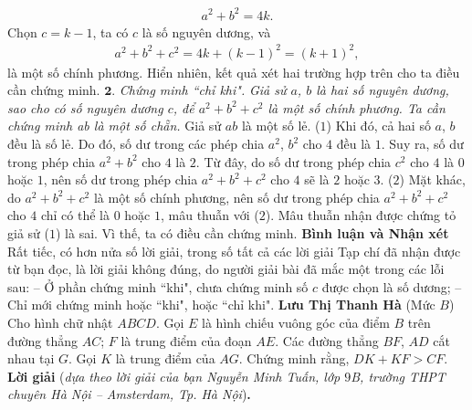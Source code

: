 \begin{multicols}{2}
\begin{align*}
		{a^2} + {b^2} = 4k.
	\end{align*}
	Chọn $c = k - 1$, ta có $c$ là số nguyên dương, và
	\begin{align*}
		{a^2} + {b^2} + {c^2} = 4k + {\left( {k - 1} \right)^2} = {\left( {k + 1} \right)^2},
	\end{align*}
	là một số chính phương.
	\vskip 0.05cm
	Hiển nhiên, kết quả xét hai trường hợp trên cho ta điều cần chứng minh.
	\vskip 0.05cm
	$\pmb{2.}$ \textit{Chứng minh ``chỉ khi".}
	\vskip 0.05cm
	\textit{Giả sử $a$, $b$ là hai số nguyên dương, sao cho có số nguyên dương $c$, để $a^2 + b^2 + c^2$  là một số chính phương. Ta cần chứng minh ab là một số chẵn.}
	\vskip 0.05cm
	Giả sử $ab$ là một số lẻ. \hfill ($1$)
	\vskip 0.05cm
	Khi đó, cả hai số $a$, $b$ đều là số lẻ. Do đó, số dư trong các phép chia  $a^2$, $b^2$ cho $4$ đều là $1$. Suy ra, số dư trong phép chia $a^2 + b^2$  cho $4$ là $2$. Từ đây, do số dư trong phép chia $c^2$ cho $4$ là $0$ hoặc $1$, nên số dư trong phép chia $a^2 + b^2 + c^2$  cho $4$ sẽ là $2$ hoặc $3$. \hfill ($2$)
	\vskip 0.05cm
	Mặt khác, do $a^2 + b^2 + c^2$ là một số chính phương, nên số dư trong phép chia  \linebreak $a^2 + b^2 + c^2$ cho $4$ chỉ có thể là $0$ hoặc $1$, mâu thuẫn với ($2$).
	\vskip 0.05cm
	Mâu thuẫn nhận được chứng tỏ giả sử ($1$) là sai. Vì thế, ta có điều cần chứng minh.
	\vskip 0.05cm
	\textbf{\color{thachthuctoanhoc}Bình luận và Nhận xét}
	\vskip 0.05cm
	Rất tiếc, có hơn nửa số lời giải, trong số tất cả các lời giải Tạp chí đã nhận được từ bạn đọc, là lời giải không đúng, do người giải bài đã mắc một trong các lỗi sau:
	\vskip 0.05cm
	-- Ở phần chứng minh ``khi", chưa chứng minh số $c$ được chọn là số dương;
	\vskip 0.05cm
	-- Chỉ mới chứng minh hoặc ``khi", hoặc ``chỉ khi".
	\vskip 0.1cm
		\hfill\textbf{\color{thachthuctoanhoc}Lưu Thị Thanh Hà}
	\vskip 0.1cm
	{}
	(Mức $B$)
	Cho hình chữ nhật $ABCD$. Gọi $E$ là hình chiếu vuông góc của điểm $B$ trên đường thẳng $AC$; $F$ là trung điểm của đoạn $AE$. Các đường thẳng $BF$, $AD$ cắt nhau tại $G$. Gọi $K$ là trung điểm của $AG$. Chứng minh rằng, $DK + KF > CF$.
	\vskip 0.05cm
	\textbf{\color{thachthuctoanhoc}Lời giải} (\textit{dựa theo lời giải của bạn Nguyễn Minh Tuấn, lớp $9$B, trường THPT chuyên Hà Nội -- Amsterdam, Tp. Hà Nội})\textbf{\color{thachthuctoanhoc}.}
	\begin{figure}[H]
		\vspace*{-10pt}
		\centering
		\captionsetup{labelformat= empty, justification=centering}

\end{figure}
\end{multicols}
